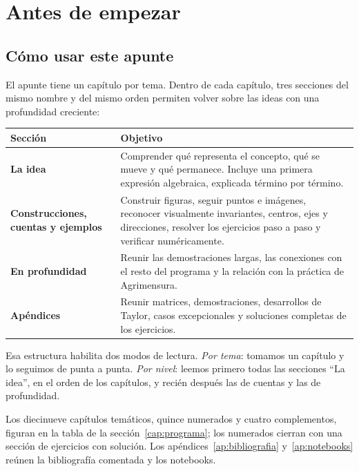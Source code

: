 \chapter{Antes de empezar}\label{cap:antes-de-empezar}

\section{Cómo usar este apunte}\label{cap:como-usar}

El apunte tiene un capítulo por tema. Dentro de cada capítulo, tres secciones del mismo
nombre y del mismo orden permiten volver sobre las ideas con una profundidad creciente:

\begin{center}
\begin{tabularx}{\textwidth}{>{\bfseries}p{34mm} X}
\toprule
Sección & Objetivo\\
\midrule
La idea & Comprender qué representa el concepto, qué se mueve y qué permanece.
Incluye una primera expresión algebraica, explicada término por término.\\
Construcciones, cuentas y ejemplos & Construir figuras, seguir puntos e imágenes, reconocer
visualmente invariantes, centros, ejes y direcciones, resolver los ejercicios paso a paso y
verificar numéricamente.\\
En profundidad & Reunir las demostraciones largas, las conexiones con el resto del programa
y la relación con la práctica de Agrimensura.\\
Apéndices & Reunir matrices, demostraciones, desarrollos de Taylor, casos excepcionales y
soluciones completas de los ejercicios.\\
\bottomrule
\end{tabularx}
\end{center}

Esa estructura habilita dos modos de lectura. \emph{Por tema}: tomamos un capítulo y lo
seguimos de punta a punta. \emph{Por nivel}: leemos primero todas las secciones
\enquote{La idea}, en el orden de los capítulos, y recién después las de cuentas y las de
profundidad.

Los diecinueve capítulos temáticos, quince numerados y cuatro complementos, figuran en la tabla
de la sección~\ref{cap:programa}; los numerados cierran con una sección de ejercicios con
solución. Los apéndices~\ref{ap:bibliografia} y~\ref{ap:notebooks} reúnen la bibliografía
comentada y los notebooks.

